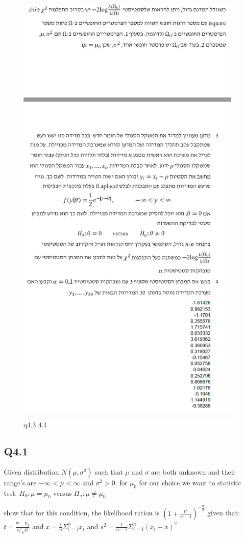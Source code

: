 \begin{figure}[htbp]
    \centering
    \includegraphics[width=0.65\linewidth]{images/q4.png}
    \caption{q4.3 4.4}
    \label{fig:q4.2}
\end{figure}

\newpage
\subsection{Q4.1}
Given distribution $N(\mu,\sigma^2)$ such that $\mu$ and $\sigma$ 
are both unknown and their range's are $- \infty < \mu < \infty $
and $\sigma^2>0$.
for $\mu_0$ for our choice we want to statistic test:
$H_0 : \mu = \mu_0 $ versus $H_a:\mu \neq \mu_0$

show that for this condition, the likelihood ration is $\left( 1+\frac{t^2}{n-1}\right)^{-\frac{n}{2}} $
given that:
$t=\frac{\overline{x}-\mu_0}{s/\sqrt{n}}$ and
$\overline{x}=\frac{1}{n}\Sigma^{n}_{i=1}x_i$ and
$s^2=\frac{1}{n-1}\Sigma^{n}_{i=1} \left(x_i - \overline{x} \right)^2$ \\

